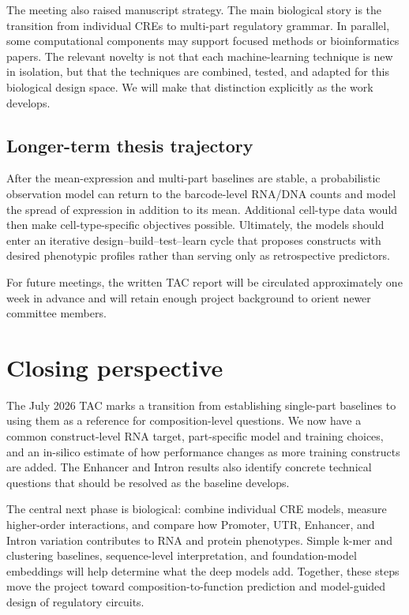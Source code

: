 \documentclass[11pt]{article}
\begin{document}
The meeting also raised manuscript strategy. The main biological story is the
transition from individual CREs to multi-part regulatory grammar. In parallel,
some computational components may support focused methods or bioinformatics
papers. The relevant novelty is not that each machine-learning technique is
new in isolation, but that the techniques are combined, tested, and adapted for
this biological design space. We will make that distinction explicitly as the
work develops.

\subsection{Longer-term thesis trajectory}

After the mean-expression and multi-part baselines are stable, a probabilistic
observation model can return to the barcode-level RNA/DNA counts and model the
spread of expression in addition to its mean. Additional cell-type data would
then make cell-type-specific objectives possible. Ultimately, the models should
enter an iterative design--build--test--learn cycle that proposes constructs
with desired phenotypic profiles rather than serving only as retrospective
predictors.

For future meetings, the written TAC report will be circulated approximately
one week in advance and will retain enough project background to orient newer
committee members.

\section*{Closing perspective}

The July 2026 TAC marks a transition from establishing single-part baselines to
using them as a reference for composition-level questions. We now have a common
construct-level RNA target, part-specific model and training choices, and an
in-silico estimate of how performance changes as more training constructs are
added. The Enhancer and Intron results also identify concrete technical
questions that should be resolved as the baseline develops.

The central next phase is biological: combine individual CRE models, measure
higher-order interactions, and compare how Promoter, UTR, Enhancer, and Intron
variation contributes to RNA and protein phenotypes. Simple k-mer and
clustering baselines, sequence-level interpretation, and foundation-model
embeddings will help determine what the deep models add. Together, these steps
move the project toward composition-to-function prediction and model-guided
design of regulatory circuits.
\end{document}
